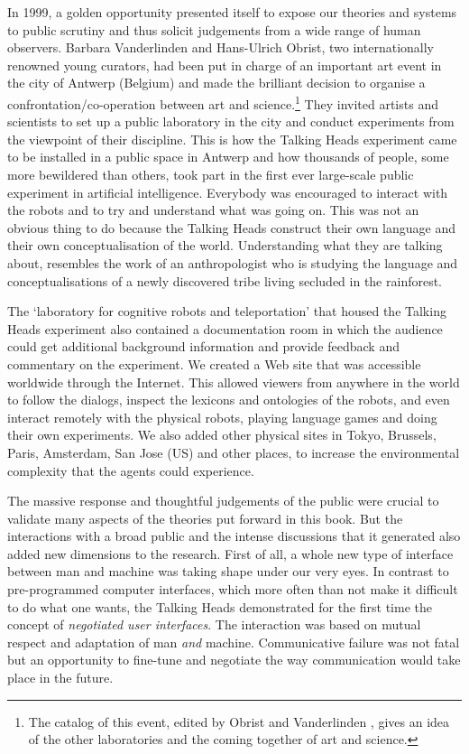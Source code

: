 In 1999, a golden opportunity presented itself to 
expose our theories and systems to public scrutiny and thus solicit
judgements from a wide range of human observers. Barbara
Vanderlinden and Hans-Ulrich Obrist, two internationally 
renowned young curators, had been put in charge of 
an important art event in the city of Antwerp (Belgium)
and made the brilliant decision to organise a 
confrontation/co-operation between art and 
science.\footnote{The catalog of this event, edited by Obrist and Vanderlinden \cite{Obrist:1999}, gives an idea of 
the other laboratories and the coming together of art and science.}
They invited 
artists and scientists to set up 
a public laboratory in the city and conduct experiments 
from the viewpoint of their discipline. This is how 
the Talking Heads experiment came to be installed in 
a public space in Antwerp and how thousands of people, 
some more bewildered than others, took part in the first
ever large-scale public experiment in artificial intelligence. 
Everybody was encouraged to interact with the robots and 
to try and understand what was going on. This was not an obvious
thing to do because the Talking Heads
construct their own language and their own conceptualisation of 
the world. Understanding what they are talking about, resembles the work 
of an anthropologist who is studying the language and
conceptualisations of a newly discovered tribe living
secluded in the rainforest. 

The `laboratory for cognitive robots and 
teleportation' that housed the 
Talking Heads experiment also contained  
a documentation room in which the audience could 
get additional background information and 
provide feedback and commentary 
on the experiment. We created a Web site that was accessible 
worldwide through the Internet. This allowed viewers from anywhere
in the world to follow the dialogs, inspect the lexicons
and ontologies 
of the robots, and even interact remotely with the 
physical robots, playing language games 
and doing their own experiments. We also added
other physical sites in Tokyo, Brussels, Paris, Amsterdam, 
San Jose (US) and other places, to increase the environmental complexity that 
the agents could experience. 

The massive response and thoughtful judgements of the 
public were crucial to validate many aspects of the 
theories put forward in this book. 
But the interactions with a broad public and
the intense discussions that it generated also added new
dimensions to the research. First of all, a whole 
new type of interface between man and machine was
taking shape under our very eyes. In contrast to pre-programmed
computer interfaces, which more often than not make it
difficult to do what one wants, the Talking Heads demonstrated
for the first time the concept of {\it negotiated user
interfaces}. The interaction was based on mutual respect
and adaptation of man {\it and} machine. Communicative
failure was not fatal but 
an opportunity to fine-tune and negotiate the way communication
would take place in the future. 

